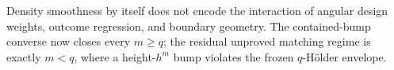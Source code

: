 Density smoothness by itself does not encode the interaction of angular design weights, outcome regression, and boundary geometry.  The contained-bump converse now closes every \(m\geq q\); the residual unproved matching regime is exactly \(m<q\), where a height-\(h^m\) bump violates the frozen \(q\)-H\"older envelope.